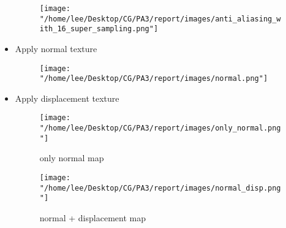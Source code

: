 \documentclass[acmtog]{acmart}
\begin{document}
\begin{itemize}
	\begin{figure}[H]
		\centering
		\texttt{[image: "/home/lee/Desktop/CG/PA3/report/images/anti\_aliasing\_with\_16\_super\_sampling.png"]}
	\end{figure}
	\item Apply normal texture
	\begin{figure}[H]
		\centering
		\texttt{[image: "/home/lee/Desktop/CG/PA3/report/images/normal.png"]}
	\end{figure}
	\item Apply displacement texture
	\begin{figure}[H]
		\centering
		\texttt{[image: "/home/lee/Desktop/CG/PA3/report/images/only\_normal.png"]}
		\caption{only normal map}
		\texttt{[image: "/home/lee/Desktop/CG/PA3/report/images/normal\_disp.png"]}
		\caption{normal + displacement map}
	\end{figure}
\end{itemize}
\end{document}
